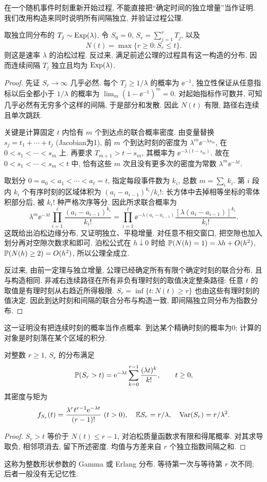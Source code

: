 在一个随机事件时刻重新开始过程, 不能直接把“确定时间的独立增量”当作证明. 我们改用构造来同时说明所有间隔独立, 并验证过程公理.
\begin{theorem}[指数间隔构造]
取独立同分布的 $T_j\sim\operatorname{Exp}(\lambda)$, 令 $S_0=0$, $S_r=\sum_{j=1}^rT_j$, 以及
\[
N(t)=\max\{r\ge0:S_r\le t\}.
\]
则这是速率 $\lambda$ 的泊松过程. 反过来, 满足前述公理的过程具有这一构造的分布, 因而连续间隔 $T_j$ 独立且均为 $\operatorname{Exp}(\lambda)$.
\end{theorem}
\begin{proof}
先证 $S_r\to\infty$ 几乎必然. 每个 $T_j\ge1/\lambda$ 的概率为 $\ee^{-1}$, 独立性保证从任意指标以后全都小于 $1/\lambda$ 的概率为 $\lim_m(1-\ee^{-1})^m=0$. 对起始指标作可数并, 可知几乎必然有无穷多个这样的间隔, 于是部分和发散. 因此 $N(t)$ 有限, 路径右连续且单次跳跃.

关键是计算固定 $t$ 内恰有 $m$ 个到达点的联合概率密度. 由变量替换 $s_j=t_1+\cdots+t_j$ (Jacobian为1), 前 $m$ 个到达时刻的密度为
$\lambda^m\ee^{-\lambda s_m}$, 在 $0<s_1<\cdots<s_m$ 上. 再要求 $T_{m+1}>t-s_m$, 其概率为 $\ee^{-\lambda(t-s_m)}$. 故在 $0<s_1<\cdots<s_m<t$ 中, 恰有这些 $m$ 次且没有更多次的密度为常数 $\lambda^m\ee^{-\lambda t}$.

取划分 $0=a_0<a_1<\cdots<a_\ell=t$, 指定每段事件数为 $k_i$, 总数 $m=\sum_i k_i$. 第 $i$ 段内 $k_i$ 个有序时刻的区域体积为 $(a_i-a_{i-1})^{k_i}/k_i!$: 长方体中去掉相等坐标的零体积部分后, 被 $k_i!$ 种严格次序等分. 因此所求联合概率为
\[
\lambda^m\ee^{-\lambda t}\prod_{i=1}^\ell\frac{(a_i-a_{i-1})^{k_i}}{k_i!}
=\prod_{i=1}^\ell\ee^{-\lambda(a_i-a_{i-1})}
\frac{[\lambda(a_i-a_{i-1})]^{k_i}}{k_i!}.
\]
这既给出泊松边缘分布, 又证明独立、平稳增量. 对任意不相交窗口, 把空隙也加入划分再对空隙次数求和即可. 泊松公式在 $h\downarrow0$ 时给 $\mathbb P(N(h)=1)=\lambda h+O(h^2)$, $\mathbb P(N(h)\ge2)=O(h^2)$, 所以公理全成立.

反过来, 由前一定理与独立增量, 公理已经确定所有有限个确定时刻的联合分布, 且与构造相同. 非减右连续路径在所有非负有理时刻的取值决定整条路径: 任意 $t$ 的取值是有理时刻从右趋近所得极限. $S_r=\inf\{t:N(t)\ge r\}$ 也由这些有理时刻的值决定. 因此到达时刻和间隔的联合分布与构造一致, 即间隔独立同分布为指数分布.
\end{proof}
这一证明没有把连续时刻的概率当作点概率. 到达某个精确时刻的概率为0; 计算的对象是时刻落在某个区域的积分.

\begin{proposition}[第 $r$ 次事件的等待时间]
对整数 $r\ge1$, $S_r$ 的分布满足
\[
\mathbb P(S_r>t)=\mathrm e^{-\lambda t}\sum_{k=0}^{r-1}\frac{(\lambda t)^k}{k!},\qquad t\ge0,
\]
其密度与矩为
\[
f_{S_r}(t)=\frac{\lambda^rt^{r-1}\mathrm e^{-\lambda t}}{(r-1)!}\ (t>0),
\quad\mathbb E S_r=r/\lambda,\quad\operatorname{Var}(S_r)=r/\lambda^2.
\]
\end{proposition}
\begin{proof}
$S_r>t$ 等价于 $N(t)\le r-1$, 对泊松质量函数求有限和得尾概率. 对其求导取负, 相邻项消去, 留下所述密度. 均值与方差来自 $r$ 个独立指数间隔之和.
\end{proof}
这称为整数形状参数的 Gamma 或 Erlang 分布. 等待第一次与等待第 $r$ 次不同; 后者一般没有无记忆性.

